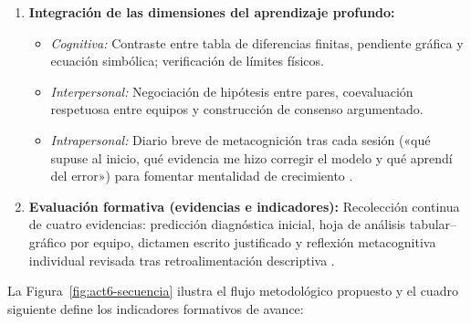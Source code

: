 \documentclass[spanish,letterpaper,oneside]{article}
\begin{document}
\begin{tcolorbox}[colback=iiiepePale,colframe=iiiepeNavy,title=\textbf{Ficha técnica de la innovación · «Calibrar y comparar para decidir» (por realizar)},breakable]
\begin{enumerate}
  \item \textbf{Integración de las dimensiones del aprendizaje profundo:}
    \begin{itemize}
      \item \textit{Cognitiva:} Contraste entre tabla de diferencias finitas, pendiente gráfica y ecuación simbólica; verificación de límites físicos.
      \item \textit{Interpersonal:} Negociación de hipótesis entre pares, coevaluación respetuosa entre equipos y construcción de consenso argumentado.
      \item \textit{Intrapersonal:} Diario breve de metacognición tras cada sesión («qué supuse al inicio, qué evidencia me hizo corregir el modelo y qué aprendí del error») para fomentar mentalidad de crecimiento \citep{schunk2012teorias}.
    \end{itemize}
  \item \textbf{Evaluación formativa (evidencias e indicadores):} Recolección continua de cuatro evidencias: predicción diagnóstica inicial, hoja de análisis tabular--gráfico por equipo, dictamen escrito justificado y reflexión metacognitiva individual revisada tras retroalimentación descriptiva \citep{bostrom2023formative}.
\end{enumerate}
\end{tcolorbox}

La Figura~\ref{fig:act6-secuencia} ilustra el flujo metodológico propuesto y el cuadro siguiente define los indicadores formativos de avance:
\end{document}
